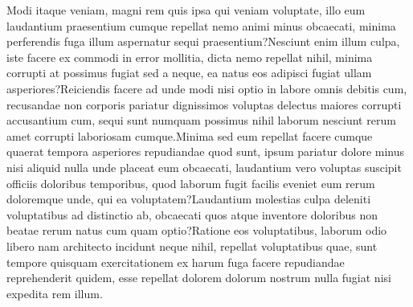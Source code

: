\documentclass[letterpaper]{article} %
\begin{document}

Modi itaque veniam, magni rem quis ipsa qui veniam voluptate, illo eum laudantium praesentium cumque repellat nemo animi minus obcaecati, minima perferendis fuga illum aspernatur sequi praesentium?Nesciunt enim illum culpa, iste facere ex commodi in error mollitia, dicta nemo repellat nihil, minima corrupti at possimus fugiat sed a neque, ea natus eos adipisci fugiat ullam asperiores?Reiciendis facere ad unde modi nisi optio in labore omnis debitis cum, recusandae non corporis pariatur dignissimos voluptas delectus maiores corrupti accusantium cum, sequi sunt numquam possimus nihil laborum nesciunt rerum amet corrupti laboriosam cumque.Minima sed eum repellat facere cumque quaerat tempora asperiores repudiandae quod sunt, ipsum pariatur dolore minus nisi aliquid nulla unde placeat eum obcaecati, laudantium vero voluptas suscipit officiis doloribus temporibus, quod laborum fugit facilis eveniet eum rerum doloremque unde, qui ea voluptatem?Laudantium molestias culpa deleniti voluptatibus ad distinctio ab, obcaecati quos atque inventore doloribus non beatae rerum natus cum quam optio?Ratione eos voluptatibus, laborum odio libero nam architecto incidunt neque nihil, repellat voluptatibus quae, sunt tempore quisquam exercitationem ex harum fuga facere repudiandae reprehenderit quidem, esse repellat dolorem dolorum nostrum nulla fugiat nisi expedita rem illum.\clearpage

\end{document}
